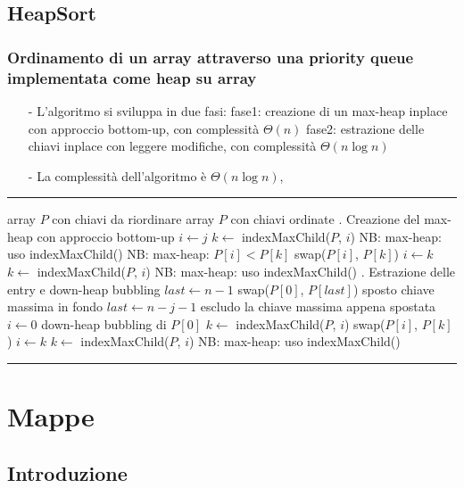 \documentclass[a4paper]{article}
\makeatletter
\newenvironment{algo}[4]{
	\noindent\rule{\textwidth}{0.4pt}
	\begin{algorithmic}[1]
		\addtocounter{ALG@line}{-1}
		\Procedure{#1}{#2}
		\Require #3
		\Ensure #4
		\Statex }{
		\EndProcedure
	\end{algorithmic}
	\rule{\textwidth}{0.4pt}}
\makeatother
\begin{document}
\subsection{HeapSort}
\subsubsection*{Ordinamento di un array attraverso una priority queue implementata come heap su array}
\begin{itemize}[topsep=3pt, itemsep=0pt]
	\item[-] L'algoritmo si sviluppa in due fasi:
	\subitem fase1: creazione di un max-heap inplace con approccio bottom-up, con complessità \(\Theta(n)\)
	\subitem fase2: estrazione delle chiavi inplace con leggere modifiche, con complessità \(\Theta(n \log n)\)
	\item[-] La complessità dell'algoritmo è \(\Theta(n \log n)\),
\end{itemize}
\begin{algo}{heapSort}{$P$}{array $P$ con chiavi da riordinare}{array $P$ con chiavi ordinate}
	. Creazione del max-heap con approccio bottom-up
		\State $i \gets j$
		\State $k \gets$ indexMaxChild($P$, $i$) \Comment NB: max-heap: uso indexMaxChild()
		 \Comment NB: max-heap: $P[i] < P[k]$
			\State swap($P[i]$, $P[k]$)
			\State $i \gets k$
			\State $k \gets$ indexMaxChild($P$, $i$) \Comment NB: max-heap: uso indexMaxChild()
		\EndWhile
	\EndFor
	. Estrazione delle entry e down-heap bubbling
	\State $last \gets n-1$
		\State swap($P[0]$, $P[last]$) \Comment sposto chiave massima in fondo
		\State $last \gets n-j-1$ \Comment escludo la chiave massima appena spostata
		\State $i \gets 0$ \Comment down-heap bubbling di $P[0]$
		\State $k \gets$ indexMaxChild($P$, $i$)
			\State swap($P[i]$, $P[k]$)
			\State $i \gets k$
			\State $k \gets$ indexMaxChild($P$, $i$) \Comment NB: max-heap: uso indexMaxChild()
		\EndWhile
	\EndFor
\end{algo}

\newpage

\section{Mappe}
\subsection{Introduzione}
\end{document}
